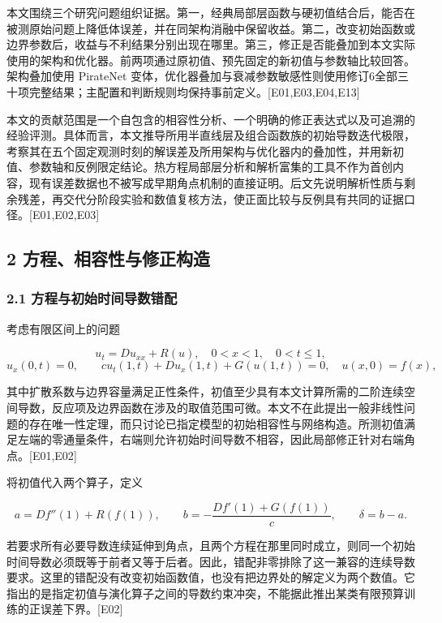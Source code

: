 \documentclass[11pt,a4paper]{article}
\begin{document}
本文围绕三个研究问题组织证据。第一，经典局部层函数与硬初值结合后，能否在被测原始问题上降低体误差，并在同架构消融中保留收益。第二，改变初始函数或边界参数后，收益与不利结果分别出现在哪里。第三，修正是否能叠加到本文实际使用的架构和优化器。前两项通过原初值、预先固定的新初值与参数轴比较回答。架构叠加使用 PirateNet 变体，优化器叠加与衰减参数敏感性则使用修订6全部三十项完整结果；主配置和判断规则均保持事前定义。{[}E01,E03,E04,E13{]}

本文的贡献范围是一个自包含的相容性分析、一个明确的修正表达式以及可追溯的经验评测。具体而言，本文推导所用半直线层及组合函数族的初始导数迭代极限，考察其在五个固定观测时刻的解误差及所用架构与优化器内的叠加性，并用新初值、参数轴和反例限定结论。热方程局部层分析和解析富集的工具不作为首创内容，现有误差数据也不被写成早期角点机制的直接证明。后文先说明解析性质与剩余残差，再交代分阶段实验和数值复核方法，使正面比较与反例具有共同的证据口径。{[}E01,E02,E03{]}

\subsection{2 方程、相容性与修正构造}\label{ux65b9ux7a0bux76f8ux5bb9ux6027ux4e0eux4feeux6b63ux6784ux9020}

\subsubsection{2.1 方程与初始时间导数错配}\label{ux65b9ux7a0bux4e0eux521dux59cbux65f6ux95f4ux5bfcux6570ux9519ux914d}

考虑有限区间上的问题

\[
u_t=D u_{xx}+R(u),\quad 0<x<1,\quad 0<t\leq1,
\tag{1}
\] \[
u_x(0,t)=0,\qquad c u_t(1,t)+D u_x(1,t)+G(u(1,t))=0,
\quad u(x,0)=f(x),
\tag{2}
\]

其中扩散系数与边界容量满足正性条件，初值至少具有本文计算所需的二阶连续空间导数，反应项及边界函数在涉及的取值范围可微。本文不在此提出一般非线性问题的存在唯一性定理，而只讨论已指定模型的初始相容性与网络构造。所测初值满足左端的零通量条件，右端则允许初始时间导数不相容，因此局部修正针对右端角点。{[}E01,E02{]}

将初值代入两个算子，定义

\[
a=Df''(1)+R(f(1)),\qquad
b=-\frac{Df'(1)+G(f(1))}{c},\qquad \delta=b-a.
\tag{3}
\]

若要求所有必要导数连续延伸到角点，且两个方程在那里同时成立，则同一个初始时间导数必须既等于前者又等于后者。因此，错配非零排除了这一兼容的连续导数要求。这里的错配没有改变初始函数值，也没有把边界处的解定义为两个数值。它指出的是指定初值与演化算子之间的导数约束冲突，不能据此推出某类有限预算训练的正误差下界。{[}E02{]}
\end{document}
